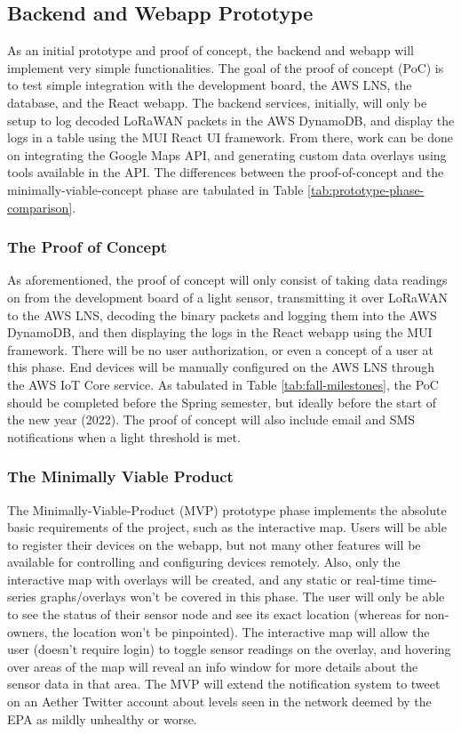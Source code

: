 \subsection{Backend and Webapp Prototype}
As an initial prototype and proof of concept, the backend and webapp will implement very simple
functionalities. The goal of the proof of concept (PoC) is to test simple integration with the
development board, the AWS LNS, the database, and the React webapp. The backend services, initially,
will only be setup to log decoded LoRaWAN packets in the AWS DynamoDB, and display the logs in
a table using the MUI React UI framework. From there, work can be done on integrating the Google
Maps API, and generating custom data overlays using tools available in the API. The differences
between the proof-of-concept and the minimally-viable-concept phase are tabulated in Table
\ref{tab:prototype-phase-comparison}.

\subsubsection{The Proof of Concept}
As aforementioned, the proof of concept will only consist of taking data readings on from the
development board of a light sensor, transmitting it over LoRaWAN to the AWS LNS, decoding the
binary packets and logging them into the AWS DynamoDB, and then displaying the logs in the React
webapp using the MUI framework. There will be no user authorization, or even a concept of a user at
this phase. End devices will be manually configured on the AWS LNS through the AWS IoT Core service.
As tabulated in Table \ref{tab:fall-milestones}, the PoC should be completed before the Spring
semester, but ideally before the start of the new year (2022). The proof of concept will also
include email and SMS notifications when a light threshold is met.

\subsubsection{The Minimally Viable Product}
The Minimally-Viable-Product (MVP) prototype phase implements the absolute basic requirements of the
project, such as the interactive map. Users will be able to register their devices on the webapp,
but not many other features will be available for controlling and configuring devices remotely.
Also, only the interactive map with overlays will be created, and any static or real-time
time-series graphs/overlays won't be covered in this phase. The user will only be able to see the
status of their sensor node and see its exact location (whereas for non-owners, the location won't
be pinpointed). The interactive map will allow the user (doesn't require login) to toggle sensor
readings on the overlay, and hovering over areas of the map will reveal an info window for more
details about the sensor data in that area. The MVP will extend the notification system to tweet on
an Aether Twitter account about levels seen in the network deemed by the EPA as mildly unhealthy or
worse.

